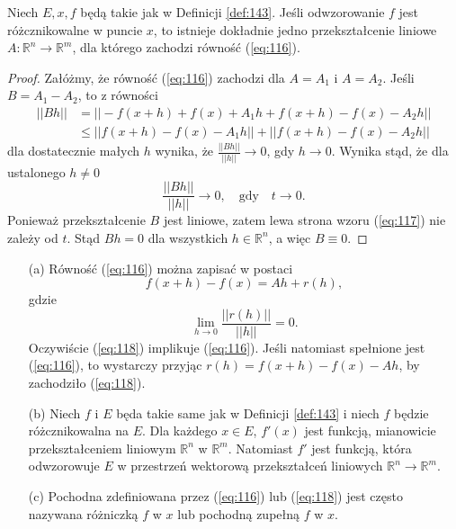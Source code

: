 \documentclass[leqno]{article}
\begin{document}
\begin{justify}
\begin{theorem}
{
    Niech $E, x, f$ będą takie jak w Definicji \ref{def:143}.
    Jeśli odwzorowanie $f$ jest różcznikowalne w puncie $x$, to istnieje dokładnie jedno przekształcenie liniowe 
    $A : \mathbb{R}^n \to \mathbb{R}^m$, dla którego zachodzi równość (\ref{eq:116}).
}
\end{theorem}

\begin{proof}
    Załóżmy, że równość (\ref{eq:116}) zachodzi dla $A = A_1$ i $A = A_2$. Jeśli $B = A_1 - A_2$,
    to z równości 
    \begin{align*}
        ||Bh|| &= ||-f(x + h) + f(x) + A_1 h + f(x + h) - f(x) - A_2 h || \\
               &\leqslant || f(x + h) - f(x) - A_1 h || + ||f(x+h) - f(x) - A_2 h ||
    \end{align*}
    dla dostatecznie małych $h$ wynika, że $\frac{||Bh||}{||h||} \to 0$, gdy $h \to 0$.
    Wynika stąd, że dla ustalonego $h \neq 0$
    \begin{equation}\label{eq:117}
        \frac{||Bh||}{||h||} \to 0, \quad \text{gdy} \quad t \to 0.
    \end{equation}
    Ponieważ przekształcenie $B$ jest liniowe, zatem lewa strona wzoru (\ref{eq:117}) nie zależy od $t$.
    Stąd $Bh = 0$ dla wszystkich $h \in \mathbb{R}^n$, a więc $B \equiv 0$.
\end{proof}

\begin{uwaga}
    \begin{itemize}
        \item [(a)]
            Równość (\ref{eq:116}) można zapisać w postaci 
            \begin{equation}\label{eq:118}
                f(x + h) - f(x) = Ah + r(h),
            \end{equation}
            gdzie 
            \[
                \lim\limits_{h \to 0} \frac{||r(h)||}{||h||} = 0.
            \]
            Oczywiście (\ref{eq:118}) implikuje (\ref{eq:116}). Jeśli natomiast spełnione jest (\ref{eq:116}), to wystarczy
            przyjąc $r(h) = f(x + h) - f(x) - Ah$, by zachodziło (\ref{eq:118}).
        \item [(b)]
            Niech $f$ i $E$ będa takie same jak w Definicji \ref{def:143} i niech $f$ będzie różcznikowalna na $E$.
            Dla każdego $x \in E$, $f'(x)$ jest funkcją, mianowicie przekształceniem liniowym $\mathbb{R}^n$ w $\mathbb{R}^m$.
            Natomiast $f'$ jest funkcją, która odwzorowuje $E$ w przestrzeń wektorową przekształceń liniowych $\mathbb{R}^n \to \mathbb{R}^m$.
        \item [(c)]
            Pochodna zdefiniowana przez (\ref{eq:116}) lub (\ref{eq:118}) jest często nazywana różniczką $f$ w $x$ lub pochodną zupełną $f$ w $x$.
    \end{itemize}
\end{uwaga}


\end{justify}
\end{document}
